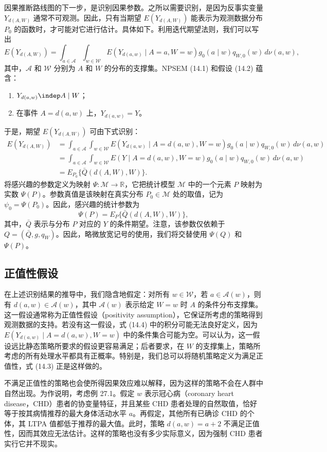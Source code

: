 因果推断路线图的下一步，是识别因果参数。之所以需要识别，是因为反事实变量 $Y_{d(A,W)}$ 通常不可观测。因此，只有当期望 $E(Y_{d(A,W)})$ 能表示为观测数据分布 $P_0$ 的函数时，才可能对它进行估计。具体如下。利用迭代期望法则，我们可以写出
\[
 E(Y_{d(A,W)})=\int_{a\in\mathcal A}\int_{w\in\mathcal W}
 E(Y_{d(a,w)}\mid A=a,W=w)g_0(a\mid w)q_{W,0}(w)\,d\nu(a,w),
\]
其中，$\mathcal A$ 和 $\mathcal W$ 分别为 $A$ 和 $W$ 的分布的支撑集。NPSEM (14.1) 和假设 (14.2) 蕴含：
\begin{enumerate}
 \item $Y_{d(a,w)}\indep A\mid W$；
 \item 在事件 $A=d(a,w)$ 上，$Y_{d(a,w)}=Y$。
\end{enumerate}
于是，期望 $E(Y_{d(A,W)})$ 可由下式识别：
\begin{equation}
\begin{aligned}
 E(Y_{d(A,W)})
 &=\int_{a\in\mathcal A}\int_{w\in\mathcal W}
 E(Y_{d(a,w)}\mid A=d(a,w),W=w)g_0(a\mid w)q_{W,0}(w)\,d\nu(a,w)\\
 &=\int_{a\in\mathcal A}\int_{w\in\mathcal W}
 E(Y\mid A=d(a,w),W=w)g_0(a\mid w)q_{W,0}(w)\,d\nu(a,w)\\
 &=E_{P_0}\{\bar Q(d(A,W),W)\}.
\end{aligned}
\tag{14.4}
\end{equation}
将感兴趣的参数定义为映射 $\Psi:\mathcal M\to\mathbb R$，它把统计模型 $\mathcal M$ 中的一个元素 $P$ 映射为实数 $\Psi(P)$。参数真值是该映射在真实分布 $P_0\in\mathcal M$ 处的取值，记为 $\psi_0=\Psi(P_0)$。因此，感兴趣的统计参数为
\begin{equation}
 \Psi(P)=E_P\{\bar Q(d(A,W),W)\},
 \tag{14.5}
\end{equation}
其中，$\bar Q$ 表示与分布 $P$ 对应的 $Y$ 的条件期望。注意，该参数仅依赖于 $Q=(\bar Q,g,q_W)$。因此，略微放宽记号的使用，我们将交替使用 $\Psi(Q)$ 和 $\Psi(P)$。

\subsection{正值性假设}

在上述识别结果的推导中，我们隐含地假定：对所有 $w\in\mathcal W$，若 $a\in\mathcal A(w)$，则有 $d(a,w)\in\mathcal A(w)$，其中 $\mathcal A(w)$ 表示给定 $W=w$ 时 $A$ 的条件分布支撑集。这一假设通常称为正值性假设（positivity assumption），它保证所考虑的策略得到观测数据的支持。若没有这一假设，式 (14.4) 中的积分可能无法良好定义，因为 $E(Y_{d(a,w)}\mid A=d(a,w),W=w)$ 中的条件集合可能为空。可以认为，这一假设远比静态策略所要求的假设更容易满足；后者要求，在 $W$ 的支撑集上，策略所考虑的所有处理水平都具有正概率。特别是，我们总可以将随机策略定义为满足正值性，式 (14.3) 正是这样做的。

不满足正值性的策略也会使所得因果效应难以解释，因为这样的策略不会在人群中自然出现。为作说明，考虑例 27.1。假定 $w$ 表示冠心病（coronary heart disease，CHD）患者的协变量特征，并且某些 CHD 患者处理的自然取值，恰好等于按其病情推荐的最大身体活动水平 $a$。再假定，其他所有已确诊 CHD 的个体，其 LTPA 值都低于推荐的最大值。此时，策略 $d(a,w)=a+2$ 不满足正值性，因而其效应无法估计。这样的策略也没有多少实际意义，因为强制 CHD 患者实行它并不现实。
